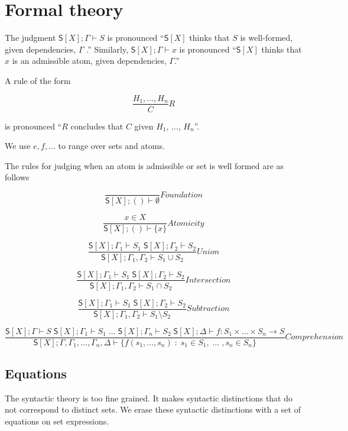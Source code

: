 \section{Formal theory}
The judgment \(\mathsf{S}[X]; \Gamma \vdash S\) is pronounced
``\(\mathsf{S}[X]\) thinks that \(S\) is well-formed, given
dependencies, \(\Gamma\) .'' Similarly,
\(\mathsf{S}[X]; \Gamma \vdash x\) is pronounced
``\(\mathsf{S}[X]\) thinks that \(x\) is an admissible atom, given
dependencies, \(\Gamma\).''

A rule of the form

\[\frac{ H_1, \ldots , H_n }{ C }R\]

is pronounced ``\(R\) concludes that \(C\) given \(H_1\), \(\ldots\),
\(H_n\)''.

We use $e,f,\ldots$ to range over sets and atoms.

The rules for judging when an atom is admissible or set is well
formed are as follows

\[\frac{ }{ \mathsf{S}[X]; () \vdash \emptyset}Foundation\]

\[\frac{ x \in X }{ \mathsf{S}[X]; () \vdash \{ x \}}Atomicity\]

\[\frac{ \mathsf{S}[X]; \Gamma_1 \vdash S_1 \; \mathsf{S}[X]; \Gamma_2 \vdash S_2}{ \mathsf{S}[X]; \Gamma_1, \Gamma_2 \vdash S_1 \cup S_2}Union\]

\[\frac{ \mathsf{S}[X]; \Gamma_1 \vdash S_1 \; \mathsf{S}[X]; \Gamma_2 \vdash S_2}{ \mathsf{S}[X]; \Gamma_1, \Gamma_2 \vdash S_1 \cap S_2}Intersection\]

\[\frac{ \mathsf{S}[X]; \Gamma_1 \vdash S_1 \; \mathsf{S}[X]; \Gamma_2 \vdash S_2}{ \mathsf{S}[X]; \Gamma_1, \Gamma_2 \vdash S_1 \setminus S_2}Subtraction\]

\[\frac{ \mathsf{S}[X]; \Gamma \vdash S \; \mathsf{S}[X]; \Gamma_{1} \vdash S_{1} \;\ldots\; \mathsf{S}[X]; \Gamma_{n} \vdash S_{2}\; \mathsf{S}[X]; \Delta \vdash f : S_{1} \times \ldots \times S_{n} \to S }{ \mathsf{S}[X]; \Gamma,\Gamma_{1},\ldots, \Gamma_{n},\Delta \vdash \{ f(s_{1},\ldots,s_{n}) \; : \; s_1 \in S_{1},\; \ldots\;, s_{n} \in S_{n}\}}Comprehension\]

\subsection{Equations}\label{equations}

The syntactic theory is too fine grained. It makes syntactic
distinctions that do not correspond to distinct sets. We erase these
syntactic distinctions with a set of equations on set expressions.

